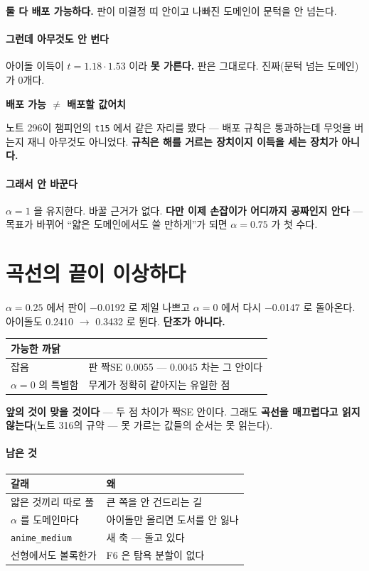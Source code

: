 \documentclass[10pt]{article}
\begin{document}
\textbf{둘 다 배포 가능하다.} 판이 미결정 띠 안이고 나빠진 도메인이 문턱을
안 넘는다.

\paragraph{그런데 아무것도 안 번다} 아이돌 이득이 $t{=}1.18 \cdot 1.53$ 이라
\textbf{못 가른다.} 판은 그대로다. 진짜(문턱 넘는 도메인)가 0개다.

\begin{center}\small
\textbf{배포 가능 $\ne$ 배포할 값어치}
\end{center}

노트 296이 챔피언의 \texttt{t15} 에서 같은 자리를 봤다 --- 배포 규칙은
통과하는데 무엇을 버는지 재니 아무것도 아니었다. \textbf{규칙은 해를 거르는
장치이지 이득을 세는 장치가 아니다.}

\paragraph{그래서 안 바꾼다} $\alpha{=}1$ 을 유지한다. 바꿀 근거가 없다.
\textbf{다만 이제 손잡이가 어디까지 공짜인지 안다} --- 목표가 바뀌어
``얇은 도메인에서도 쓸 만하게''가 되면 $\alpha{=}0.75$ 가 첫 수다.

\section{곡선의 끝이 이상하다}

$\alpha{=}0.25$ 에서 판이 $-$0.0192 로 제일 나쁘고 $\alpha{=}0$ 에서 다시
$-$0.0147 로 돌아온다. 아이돌도 0.2410 $\to$ 0.3432 로 뛴다.
\textbf{단조가 아니다.}

\begin{center}\footnotesize
\begin{tabular}{ll}
\hline
가능한 까닭 & \\
\hline
잡음 & 판 짝SE 0.0055 --- 0.0045 차는 그 안이다 \\
$\alpha{=}0$ 의 특별함 & 무게가 정확히 같아지는 유일한 점 \\
\hline
\end{tabular}
\end{center}

\textbf{앞의 것이 맞을 것이다} --- 두 점 차이가 짝SE 안이다. 그래도
\textbf{곡선을 매끄럽다고 읽지 않는다}(노트 316의 규약 --- 못 가르는 값들의
순서는 못 읽는다).

\paragraph{남은 것}
\begin{center}\small
\begin{tabular}{ll}
\hline
갈래 & 왜 \\
\hline
얇은 것끼리 따로 풀 & 큰 쪽을 안 건드리는 길 \\
$\alpha$ 를 도메인마다 & 아이돌만 올리면 도서를 안 잃나 \\
\texttt{anime\_medium} & 새 축 --- 돌고 있다 \\
선형에서도 볼록한가 & F6 은 탐욕 분할이 없다 \\
\hline
\end{tabular}
\end{center}
\end{document}
